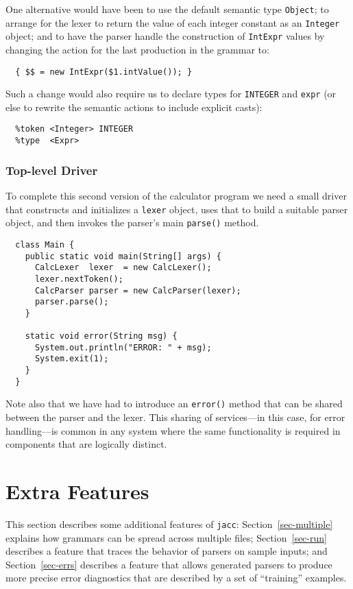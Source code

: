 \documentclass[12pt]{article}
\def\jacc{{\tt jacc}}
\begin{document}
One alternative would have been to use the default semantic
type \verb"Object"; to arrange for the lexer to return the
value of each integer constant as an \verb"Integer" object;
and to have the parser handle the construction of \verb"IntExpr"
values by changing the action for the last production in the
grammar to:
{\small
\begin{verbatim}
  { $$ = new IntExpr($1.intValue()); }
\end{verbatim}
}%
Such a change would also require us to declare types for
\verb"INTEGER" and \verb"expr" (or else to rewrite the
semantic actions to include explicit casts):
{\small
\begin{verbatim}
  %token <Integer> INTEGER
  %type  <Expr>    
\end{verbatim}
}%

\subsubsection{Top-level Driver}
To complete this second version of the calculator program
we need a small driver that constructs and initializes a
\verb"lexer" object, uses that to build a suitable parser
object, and then invokes the parser's main \verb"parse()"
method.
{\small
\begin{verbatim}
  class Main {
    public static void main(String[] args) {
      CalcLexer  lexer  = new CalcLexer();
      lexer.nextToken();
      CalcParser parser = new CalcParser(lexer);
      parser.parse();
    }

    static void error(String msg) {
      System.out.println("ERROR: " + msg);
      System.exit(1);
    }
  }
\end{verbatim}
}%
Note also that we have had to introduce an \verb"error()" method
that can be shared between the parser and the lexer.  This sharing
of services---in this case, for error handling---is common in any
system where the same functionality is required in components that
are logically distinct.

\section{Extra Features}
This section describes some additional features of \jacc:
Section~\ref{sec-multiple} explains how
grammars can be spread across multiple files;
Section~\ref{sec-run} describes a feature that
traces the behavior of parsers on sample inputs; and
Section~\ref{sec-errs} describes a feature that allows generated
parsers to produce more precise error diagnostics that are
described by a set of ``training'' examples.
\end{document}
